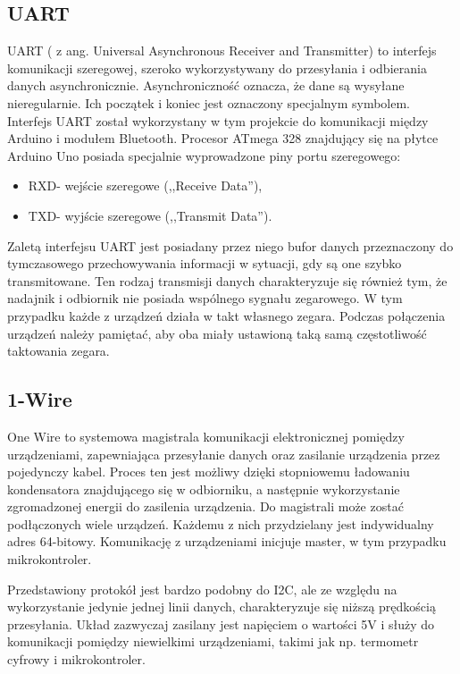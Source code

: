 \subsection{UART}%
UART ( z ang. Universal Asynchronous Receiver and Transmitter) to interfejs komunikacji szeregowej, szeroko wykorzystywany do przesyłania i odbierania danych asynchronicznie. Asynchroniczność oznacza, że dane są wysyłane nieregularnie. Ich początek i koniec jest oznaczony specjalnym symbolem. Interfejs UART został wykorzystany w tym projekcie do komunikacji między Arduino i modułem Bluetooth.
Procesor ATmega 328 znajdujący się na płytce Arduino Uno posiada specjalnie wyprowadzone piny portu szeregowego:
\begin{itemize}
\item{RXD- wejście szeregowe (,,Receive Data''),}
\item{TXD- wyjście szeregowe (,,Transmit Data'').}
\end{itemize}
Zaletą interfejsu UART jest posiadany przez niego bufor danych przeznaczony do tymczasowego przechowywania informacji w sytuacji, gdy są one szybko transmitowane.
Ten rodzaj transmisji danych charakteryzuje się również tym, że nadajnik i odbiornik nie posiada wspólnego sygnału zegarowego. W tym przypadku każde z urządzeń działa w takt własnego zegara. Podczas połączenia urządzeń należy pamiętać, aby oba miały ustawioną taką samą częstotliwość taktowania zegara.

\subsection{1-Wire}%
One Wire to systemowa magistrala komunikacji elektronicznej pomiędzy urządzeniami, zapewniająca przesyłanie danych oraz zasilanie urządzenia przez pojedynczy kabel. Proces ten jest możliwy dzięki stopniowemu ładowaniu kondensatora znajdującego się w odbiorniku, a następnie wykorzystanie zgromadzonej energii do zasilenia urządzenia. Do magistrali może zostać podłączonych wiele urządzeń. Każdemu z nich przydzielany jest indywidualny adres 64-bitowy. Komunikację z urządzeniami inicjuje master, w tym przypadku mikrokontroler.

Przedstawiony protokół jest bardzo podobny do I2C, ale ze względu na wykorzystanie jedynie jednej linii danych, charakteryzuje się niższą prędkością przesyłania. Układ zazwyczaj zasilany jest napięciem o wartości 5V i służy do komunikacji pomiędzy niewielkimi urządzeniami, takimi jak np. termometr cyfrowy i mikrokontroler.

